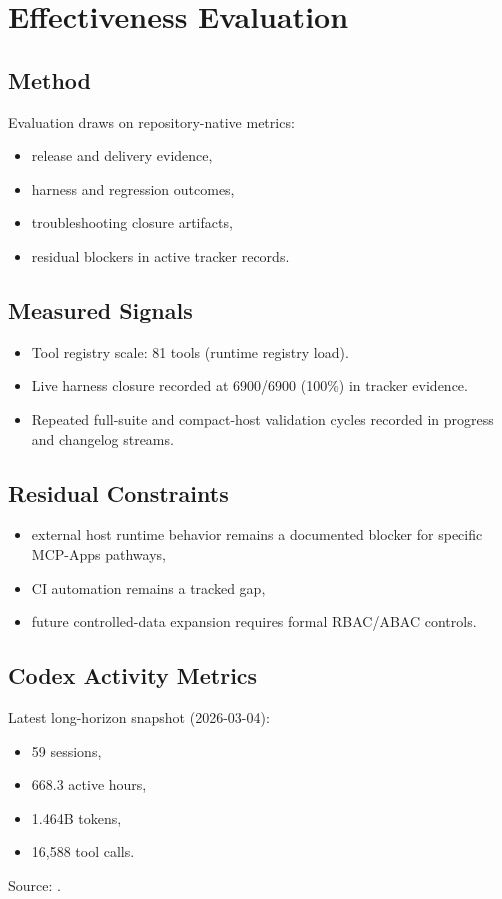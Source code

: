 \chapter{Effectiveness Evaluation}
\label{ch:evaluation}

\section{Method}

Evaluation draws on repository-native metrics:
\begin{itemize}
  \item release and delivery evidence,
  \item harness and regression outcomes,
  \item troubleshooting closure artifacts,
  \item residual blockers in active tracker records.
\end{itemize}

\section{Measured Signals}

\begin{itemize}
  \item Tool registry scale: 81 tools (runtime registry load).
  \item Live harness closure recorded at 6900/6900 (100\%) in tracker evidence.
  \item Repeated full-suite and compact-host validation cycles recorded in
  progress and changelog streams.
\end{itemize}

\section{Residual Constraints}

\begin{itemize}
  \item external host runtime behavior remains a documented blocker for specific
  MCP-Apps pathways,
  \item CI automation remains a tracked gap,
  \item future controlled-data expansion requires formal RBAC/ABAC controls.
\end{itemize}

\section{Codex Activity Metrics}

Latest long-horizon snapshot (2026-03-04):
\begin{itemize}
  \item 59 sessions,
  \item 668.3 active hours,
  \item 1.464B tokens,
  \item 16,588 tool calls.
\end{itemize}

Source: \cite{codex_long_horizon_20260304}.
